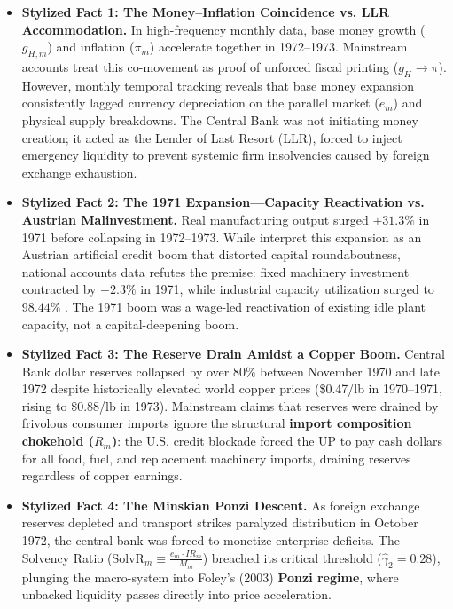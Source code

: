 \begin{itemize}[leftmargin=2em]
	\item \textbf{Stylized Fact 1: The Money--Inflation Coincidence vs. LLR Accommodation.} In high-frequency monthly data, base money growth ($g_{H,m}$) and inflation ($\pi_m$) accelerate together in 1972--1973. Mainstream accounts \citep{Edwards2024} treat this co-movement as proof of unforced fiscal printing ($g_H \to \pi$). However, monthly temporal tracking reveals that base money expansion consistently lagged currency depreciation on the parallel market ($e_m$) and physical supply breakdowns. The Central Bank was not initiating money creation; it acted as the Lender of Last Resort (LLR), forced to inject emergency liquidity to prevent systemic firm insolvencies caused by foreign exchange exhaustion.
	\item \textbf{Stylized Fact 2: The 1971 Expansion---Capacity Reactivation vs. Austrian Malinvestment.} Real manufacturing output surged $+31.3\%$ in 1971 before collapsing in 1972--1973. While \citet{EspinosaVejar2025} interpret this expansion as an Austrian artificial credit boom that distorted capital roundaboutness, national accounts data refutes the premise: fixed machinery investment contracted by $-2.3\%$ in 1971, while industrial capacity utilization surged to $98.44\%$ \citep{Braun2000}. The 1971 boom was a wage-led reactivation of existing idle plant capacity, not a capital-deepening boom.
	\item \textbf{Stylized Fact 3: The Reserve Drain Amidst a Copper Boom.} Central Bank dollar reserves collapsed by over $80\%$ between November 1970 and late 1972 despite historically elevated world copper prices (\$0.47/lb in 1970--1971, rising to \$0.88/lb in 1973). Mainstream claims that reserves were drained by frivolous consumer imports \citep{DornbuschEdwards1990} ignore the structural \textbf{import composition chokehold ($R_m$)}: the U.S. credit blockade forced the UP to pay cash dollars for all food, fuel, and replacement machinery imports, draining reserves regardless of copper earnings.
	\item \textbf{Stylized Fact 4: The Minskian Ponzi Descent.} As foreign exchange reserves depleted and transport strikes paralyzed distribution in October 1972, the central bank was forced to monetize enterprise deficits. The Solvency Ratio ($\text{SolvR}_m \equiv \frac{e_m \cdot IR_m}{M_m}$) breached its critical threshold ($\hat{\gamma}_2 = 0.28$), plunging the macro-system into Foley's (2003) \textbf{Ponzi regime}, where unbacked liquidity passes directly into price acceleration.
\end{itemize}


